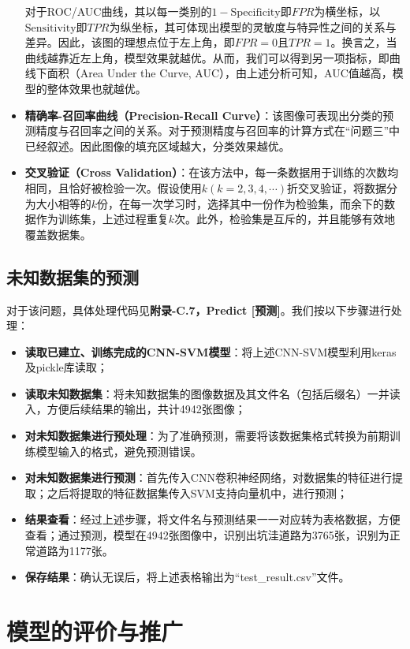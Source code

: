 \documentclass{MathorCupmodeling}
\begin{document}
\begin{itemize}
		对于ROC/AUC曲线，其以每一类别的$1-\mathrm{Specificity}$即$FPR$为横坐标，以$\mathrm{Sensitivity}$即$TPR$为纵坐标，其可体现出模型的灵敏度与特异性之间的关系与差异。因此，该图的理想点位于左上角，即$FPR=0$且$TPR=1$。换言之，当曲线越靠近左上角，模型效果就越优。从而，我们可以得到另一项指标，即曲线下面积（Area Under the Curve, AUC），由上述分析可知，AUC值越高，模型的整体效果也就越优。
		\item \textbf{精确率-召回率曲线（Precision-Recall Curve）}：该图像可表现出分类的预测精度与召回率之间的关系\textcolor{blue}{\cite{Yellowbrick}}。对于预测精度与召回率的计算方式在“问题三”中已经叙述。因此图像的填充区域越大，分类效果越优。
		\item \textbf{交叉验证（Cross Validation）}：在该方法中，每一条数据用于训练的次数均相同，且恰好被检验一次。假设使用$k(k=2,3,4,\cdots)$折交叉验证，将数据分为大小相等的$k$份，在每一次学习时，选择其中一份作为检验集，而余下的数据作为训练集，上述过程重复$k$次。此外，检验集是互斥的，并且能够有效地覆盖数据集\textcolor{blue}{\cite{数据挖掘导论}}。
	\end{itemize}


	\subsection{未知数据集的预测}
	对于该问题，具体处理代码见\textbf{附录-C.7，Predict [预测]}。我们按以下步骤进行处理：
	\begin{itemize}
		\item \textbf{读取已建立、训练完成的CNN-SVM模型}：将上述CNN-SVM模型利用keras及pickle库读取；
		\item \textbf{读取未知数据集}：将未知数据集的图像数据及其文件名（包括后缀名）一并读入，方便后续结果的输出，共计4942张图像；
		\item \textbf{对未知数据集进行预处理}：为了准确预测，需要将该数据集格式转换为前期训练模型输入的格式，避免预测错误。
		\item \textbf{对未知数据集进行预测}：首先传入CNN卷积神经网络，对数据集的特征进行提取；之后将提取的特征数据集传入SVM支持向量机中，进行预测；
		\item \textbf{结果查看}：经过上述步骤，将文件名与预测结果一一对应转为表格数据，方便查看；通过预测，模型在4942张图像中，识别出坑洼道路为3765张，识别为正常道路为1177张。
		\item \textbf{保存结果}：确认无误后，将上述表格输出为“test\_result.csv”文件。
	\end{itemize}
	\section{模型的评价与推广}
\end{document}
